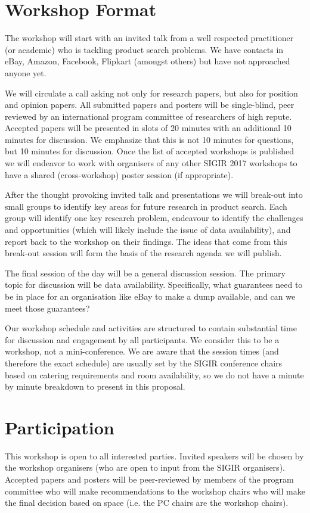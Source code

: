 \documentclass{acmart}
\begin{document}
\section{Workshop Format}

The workshop will start with an invited talk from a well respected
practitioner (or academic) who is tackling product search problems.
We have contacts in eBay, Amazon, Facebook, Flipkart (amongst others)
but have not approached anyone yet.

We will circulate a call asking not only for
research papers, but also for position and opinion papers.  All
submitted papers and posters will be single-blind, peer reviewed by an
international program committee of researchers of high repute.  Accepted
papers will be presented in slots of 20 minutes with an additional 10
minutes for discussion.  We emphasize that this is not 10 minutes for
questions, but 10 minutes for discussion.  Once the list of accepted
workshops is published we will endeavor to work with organisers of any
other SIGIR 2017 workshops to have a shared (cross-workshop) poster
session (if appropriate). 

After the thought provoking invited talk and presentations we will
break-out into small groups to identify key areas for future research in
product search. Each group will identify one key research problem, endeavour
to identify the challenges and opportunities (which will likely include
the issue of data availability), and report back to the workshop on
their findings.  The ideas that come from this break-out session will
form the basis of the research agenda we will publish.

The final session of the day will be a general discussion session.  The
primary topic for discussion will be data availability.  Specifically,
what guarantees need to be in place for an organisation like eBay to make
a dump available, and can we meet those guarantees?

Our workshop schedule and activities are structured to contain
substantial time for discussion and engagement by all participants.  We
consider this to be a workshop, not a mini-conference.  We are aware
that the session times (and therefore the exact schedule) are usually
set by the SIGIR conference chairs based on catering requirements and
room availability, so we do not have a minute by minute breakdown to
present in this proposal.

\section{Participation}
This workshop is open to all interested parties. Invited speakers will be chosen
by the workshop organisers (who are open to input from the SIGIR organisers). Accepted
papers and posters will be peer-reviewed by members of the program committee who will
make recommendations to the workshop chairs who will make the final decision based on 
space (i.e. the PC chairs are the workshop chairs).
\end{document}
